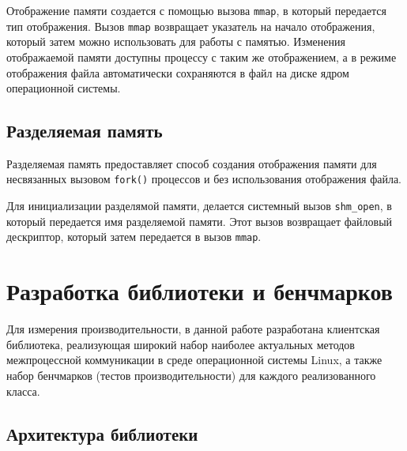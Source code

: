 \documentclass[14pt, russian]{scrartcl}
\begin{document}
Отображение памяти создается с помощью вызова \verb|mmap|, в который передается
тип отображения. Вызов \verb|mmap| возвращает указатель на начало отображения,
который затем можно использовать для работы с памятью. Изменения отображаемой
памяти доступны процессу с таким же отображением, а в режиме отображения файла
автоматически сохраняются в файл на диске ядром операционной системы.

\subsection{Разделяемая память}

Разделяемая память предоставляет способ создания отображения памяти для
несвязанных вызовом \verb|fork()| процессов и без использования отображения
файла.

Для инициализации разделямой памяти, делается системный вызов \verb|shm_open|, в
который передается имя разделяемой памяти. Этот вызов возвращает файловый
дескриптор, который затем передается в вызов \verb|mmap|.

\section{Разработка библиотеки и бенчмарков}

Для измерения производительности, в данной работе разработана клиентская
библиотека, реализующая широкий набор наиболее актуальных методов межпроцессной
коммуникации в среде операционной системы Linux, а также набор бенчмарков
(тестов производительности) для каждого реализованного класса.

\subsection{Архитектура библиотеки}
\end{document}
